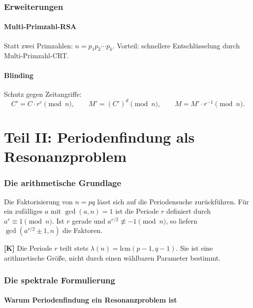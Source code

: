 \section{Erweiterungen}

\subsection{Multi-Primzahl-RSA}

Statt zwei Primzahlen: $n = p_1 p_2 \cdots p_k$. Vorteil: schnellere
Entschlüsselung durch Multi-Primzahl-CRT.

\subsection{Blinding}

Schutz gegen Zeitangriffe:
\[
  C' = C \cdot r^e \pmod n, \qquad
  M' = (C')^d \pmod n, \qquad
  M = M' \cdot r^{-1} \pmod n.
\]

\part*{Teil II: Periodenfindung als Resonanzproblem}

\section{Die arithmetische Grundlage}

Die Faktorisierung von $n = pq$ lässt sich auf die Periodensuche
zurückführen. Für ein zufälliges $a$ mit $\gcd(a,n) = 1$ ist die
Periode $r$ definiert durch $a^r \equiv 1 \pmod n$. Ist $r$ gerade
und $a^{r/2} \not\equiv -1 \pmod n$, so liefern $\gcd(a^{r/2}\pm1,n)$
die Faktoren.

\textbf{[K]} Die Periode $r$ teilt stets $\lambda(n)=\mathrm{lcm}(p-1,
q-1)$. Sie ist eine arithmetische Größe, nicht durch einen wählbaren
Parameter bestimmt.

\section{Die spektrale Formulierung}

\subsection{Warum Periodenfindung ein Resonanzproblem ist}

